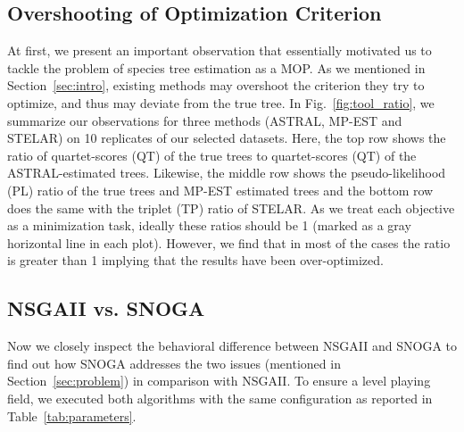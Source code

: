 \subsection{Overshooting of Optimization Criterion}
\label{subsec:observation}
At first, we present an important observation that essentially motivated us to tackle the problem of species tree estimation as a MOP. As we mentioned in Section~\ref{sec:intro}, existing methods may overshoot the criterion they try to optimize, and thus may deviate from the true tree. In Fig.~\ref{fig:tool_ratio}, we summarize our observations for three methods (ASTRAL, MP-EST and STELAR) on 10 replicates of our selected datasets. Here, the top row shows the ratio of quartet-scores (QT) of the true trees to quartet-scores (QT) of the ASTRAL-estimated trees. Likewise, the middle row shows the pseudo-likelihood (PL) ratio of the true trees and MP-EST estimated trees and the bottom row does the same with the triplet (TP) ratio of STELAR. As we treat each objective as a minimization task, ideally these ratios should be 1 (marked as a gray horizontal line in each plot). However, we find that in most of the cases the ratio is greater than 1 implying that the results have been over-optimized. 


\subsection{NSGAII vs. SNOGA}
Now we closely inspect the behavioral difference between NSGAII and SNOGA to find out how SNOGA addresses the two issues (mentioned in Section~\ref{sec:problem}) in comparison with NSGAII. To ensure a level playing field, we executed both algorithms with the same configuration as reported in Table~\ref{tab:parameters}. 

